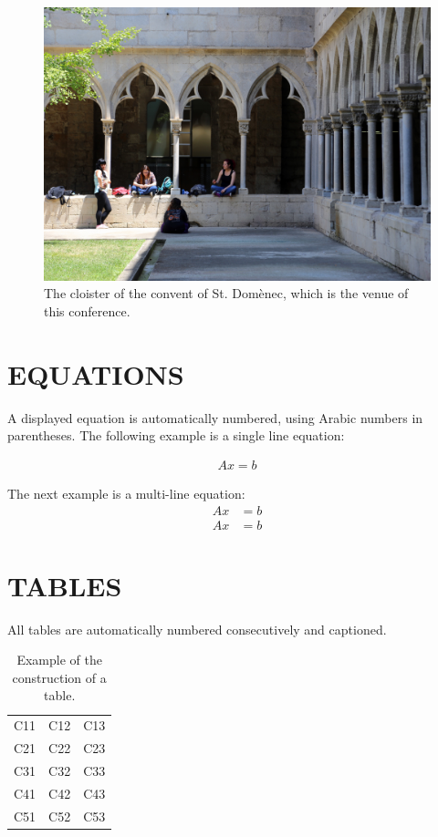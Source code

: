 \documentclass[12pt,a4paper]{article}
\begin{document}
\begin{figure}[!h]
 \centering\includegraphics[width=0.65\linewidth]{Claustre.pdf}
 \caption{The cloister of the convent of St. Domènec, which is the venue of this conference.}
 \label{fig:Claustre}
\end{figure}

\section{EQUATIONS}

A displayed equation is automatically numbered, using Arabic numbers in parentheses.
The following example is a single line equation:

\begin{align}
 Ax = b
\end{align}

The next example is a multi-line equation:
\begin{equation}
 \begin{aligned}
  Ax &=b \\
  Ax &=b
 \end{aligned}
\end{equation}


\section{TABLES}
All tables are automatically numbered consecutively and captioned.

\begin{table}[!h]
\centering
\caption{Example of the construction of a table.}
\setlength{\arrayrulewidth}{2\arrayrulewidth}
\begin{tabular}{ccc}
\hline
C11 & C12 & C13 \\
C21 & C22 & C23 \\
C31 & C32 & C33 \\
C41 & C42 & C43 \\
C51 & C52 & C53 \\
\hline
\end{tabular}
\end{table}
\end{document}
